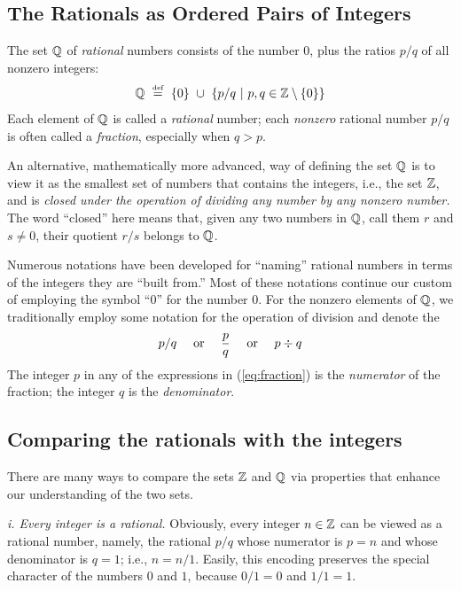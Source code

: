 \subsection{The Rationals as Ordered Pairs of Integers}

The set $\mathbb{Q}$ of {\it rational} numbers
consists of the number $0$, plus the ratios $p/q$ of all nonzero
integers:
\[ \Q \ \eqdef \ \{0\} \ \cup \ \left\{ p/q \ | \ p, q \in \Z
\setminus \{0\} \right\}
\]
Each element of $\mathbb{Q}$ is called a {\it rational} number;
each {\em nonzero} rational number $p/q$ is often called a {\em
  fraction},
especially when $q > p$.

An alternative, mathematically more advanced, way of defining the set
$\mathbb{Q}$ is to view it as the smallest set of numbers that contains the
integers, i.e., the set $\mathbb{Z}$, and is {\it closed under the operation
  of dividing any number by any nonzero number.}
The word ``closed'' here means that, given any two numbers in $\mathbb{Q}$,
call them $r$ and $s \neq 0$, their quotient $r/s$ belongs to $\mathbb{Q}$.

Numerous notations have been developed for ``naming'' rational numbers
in terms of the integers they are ``built from.''  Most of these
notations continue our custom of employing the symbol ``$0$'' for the
number $0$.  For the nonzero elements of $\mathbb{Q}$, we traditionally employ
some notation for the operation of division and denote the
\begin{equation}
\label{eq:fraction}
 p/q \ \ \ \mbox{ or } \ \ \ {p \over q} \ \ \ \mbox{ or } \ \ \ p
 \div q
\end{equation}
The integer $p$ in any of the expressions in (\ref{eq:fraction}) is
the {\it numerator}
of the fraction; the integer $q$ is the {\it denominator}.


\subsection{Comparing the rationals with the integers}

There are many ways to compare the sets $\mathbb{Z}$ and $\mathbb{Q}$ via properties
that enhance our understanding of the two sets.

\medskip

{\it i. Every integer is a rational.}
%
Obviously, every integer $n \in \mathbb{Z}$ can be viewed as a rational
number, namely, the rational $p/q$ whose numerator is $p = n$ and
whose denominator is $q = 1$; i.e., $n = n/1$.  Easily, this encoding
preserves the special character of the numbers $0$ and $1$, because
$0/1 = 0$ and $1/1 = 1$.


